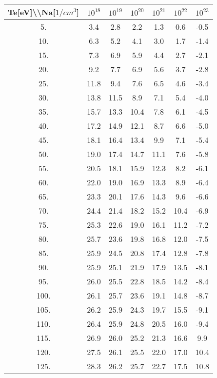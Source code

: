 \begin{tabular}{|c||c|c|c|c|c|c|}
\hline
Te[eV]\textbackslash \textbackslash Na[$1/cm^3$] & $10^{18}$ & $10^{19}$ & $10^{20}$ & $10^{21}$ & $10^{22}$ & $10^{23}$\tabularnewline
\hline
\hline
   5. &     3.4 &     2.8 &     2.2 &     1.3 &     0.6 &    -0.5\tabularnewline
\hline
  10. &     6.3 &     5.2 &     4.1 &     3.0 &     1.7 &    -1.4\tabularnewline
\hline
  15. &     7.3 &     6.9 &     5.9 &     4.4 &     2.7 &    -2.1\tabularnewline
\hline
  20. &     9.2 &     7.7 &     6.9 &     5.6 &     3.7 &    -2.8\tabularnewline
\hline
  25. &    11.8 &     9.4 &     7.6 &     6.5 &     4.6 &    -3.4\tabularnewline
\hline
  30. &    13.8 &    11.5 &     8.9 &     7.1 &     5.4 &    -4.0\tabularnewline
\hline
  35. &    15.7 &    13.3 &    10.4 &     7.8 &     6.1 &    -4.5\tabularnewline
\hline
  40. &    17.2 &    14.9 &    12.1 &     8.7 &     6.6 &    -5.0\tabularnewline
\hline
  45. &    18.1 &    16.4 &    13.4 &     9.9 &     7.1 &    -5.4\tabularnewline
\hline
  50. &    19.0 &    17.4 &    14.7 &    11.1 &     7.6 &    -5.8\tabularnewline
\hline
  55. &    20.5 &    18.1 &    15.9 &    12.3 &     8.2 &    -6.1\tabularnewline
\hline
  60. &    22.0 &    19.0 &    16.9 &    13.3 &     8.9 &    -6.4\tabularnewline
\hline
  65. &    23.3 &    20.1 &    17.6 &    14.3 &     9.6 &    -6.6\tabularnewline
\hline
  70. &    24.4 &    21.4 &    18.2 &    15.2 &    10.4 &    -6.9\tabularnewline
\hline
  75. &    25.3 &    22.6 &    19.0 &    16.1 &    11.2 &    -7.2\tabularnewline
\hline
  80. &    25.7 &    23.6 &    19.8 &    16.8 &    12.0 &    -7.5\tabularnewline
\hline
  85. &    25.9 &    24.5 &    20.8 &    17.4 &    12.8 &    -7.8\tabularnewline
\hline
  90. &    25.9 &    25.1 &    21.9 &    17.9 &    13.5 &    -8.1\tabularnewline
\hline
  95. &    26.0 &    25.5 &    22.8 &    18.5 &    14.2 &    -8.4\tabularnewline
\hline
 100. &    26.1 &    25.7 &    23.6 &    19.1 &    14.8 &    -8.7\tabularnewline
\hline
 105. &    26.2 &    25.9 &    24.3 &    19.7 &    15.5 &    -9.1\tabularnewline
\hline
 110. &    26.4 &    25.9 &    24.8 &    20.5 &    16.0 &    -9.4\tabularnewline
\hline
 115. &    26.9 &    26.0 &    25.2 &    21.3 &    16.6 &     9.9\tabularnewline
\hline
 120. &    27.5 &    26.1 &    25.5 &    22.0 &    17.0 &    10.4\tabularnewline
\hline
 125. &    28.3 &    26.2 &    25.7 &    22.7 &    17.5 &    10.8\tabularnewline
\hline
\end{tabular}

